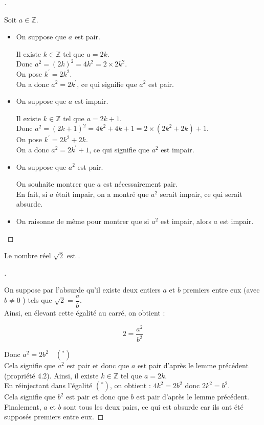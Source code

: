 \documentclass[12pt]{article}
\newcommand{\hide}[1]{\mbox{\vphantom{#1}\smash{\colorbox{gray!50}{#1}}}}
\theoremstyle{break}
\newenvironment{demo}[1][\proofname]{%
  \begin{proof}[#1]$ $\newline
}{%
  \end{proof}
}
\begin{document}
\begin{demo}
Soit $a \in \mathbb{Z}$.

\begin{itemize}[noitemsep,topsep=0pt]
  \item On suppose que $a$ est pair.

Il existe $k \in \mathbb{Z}$ tel que $a=2 k$.\\
Donc $a^{2}=(2 k)^{2}=4 k^{2}=2 \times 2 k^{2}$.\\
On pose $k^{\prime}=2 k^{2}$.\\
On a donc $a^{2}=2 k^{\prime}$, ce qui signifie que $a^{2}$ est pair.

  \item On suppose que $a$ est impair.

Il existe $k \in \mathbb{Z}$ tel que $a=2 k+1$.\\
Donc $a^{2}=(2 k+1)^{2}=4 k^{2}+4 k+1=2 \times\left(2 k^{2}+2 k\right)+1$.\\
On pose $k^{\prime}=2 k^{2}+2 k$.\\
On a donc $a^{2}=2 k^{\prime}+1$, ce qui signifie que $a^{2}$ est impair.

  \item On suppose que $a^{2}$ est pair.

On souhaite montrer que $a$ est nécessairement pair.\\
En fait, si $a$ était impair, on a montré que $a^{2}$ serait impair, ce qui serait absurde.

  \item On raisonne de même pour montrer que si $a^{2}$ est impair, alors $a$ est impair.
\end{itemize}
\end{demo}

\begin{proposition}{}{}
Le nombre réel $\sqrt{2}$ est \hide{irrationnel}.
\end{proposition}

\begin{demo}
On suppose par l'absurde qu'il existe deux entiers $a$ et $b$ premiers entre eux (avec $b \neq 0$ ) tels que $\sqrt{2}=\dfrac{a}{b}$.\\
Ainsi, en élevant cette égalité au carré, on obtient :

$$
2=\frac{a^{2}}{b^{2}}
$$

Donc $a^{2}=2 b^{2} \quad\left({ }^{*}\right)$\\
Cela signifie que $a^{2}$ est pair et donc que $a$ est pair d'après le lemme précédent (propriété 4.2). Ainsi, il existe $k \in \mathbb{Z}$ tel que $a=2 k$.\\
En réinjectant dans l'égalité $\left({ }^{*}\right)$, on obtient : $4 k^{2}=2 b^{2}$ donc $2 k^{2}=b^{2}$.\\
Cela signifie que $b^{2}$ est pair et donc que $b$ est pair d'après le lemme précédent.\\
Finalement, $a$ et $b$ sont tous les deux pairs, ce qui est absurde car ils ont été supposés premiers entre eux.
\end{demo}
\end{document}
